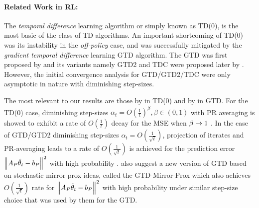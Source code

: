 \paragraph{Related Work in RL:} The \emph{temporal difference} learning algorithm or simply known as TD(0), is the most basic of the class of TD algorithms. An important shortcoming of TD(0) was its instability in the \emph{off-policy} case, and was successfully mitigated by the \emph{gradient temporal difference} learning GTD algorithm\cite{gtd2}. The GTD was first proposed by \citet{gtd} and its variants namely GTD2 and TDC were proposed later by \citet{gtd2}. However, the initial convergence analysis for GTD/GTD2/TDC were only asymptotic in nature \cite{gtd,gtd2} with diminishing step-sizes.\par
The most relevant to our results are those by \citet{korda-prashanth} in TD(0) and by \citet{gtdmp} in GTD. For the TD(0) case,  diminishing step-sizes $\alpha_t=O(\frac{1}{t})^\beta,\beta \in(0,1)$ with PR averaging is showed to exhibit a rate of $O(\frac{1}{t})$ decay for the MSE when $\beta\rightarrow 1$ \cite{korda-prashanth}. In the case of GTD/GTD2 diminishing step-sizes $\alpha_t=O(\frac{1}{\sqrt{t}})$, projection of iterates and PR-averaging leads to a rate of $O(\frac{1}{\sqrt{t}})$ is achieved for the prediction error $\left\| A_P\hat{\theta}_t-b_P\right\|^2$ with high probability \cite{gtdmp}. \citet{gtdmp} also suggest a new version of GTD based on stochastic mirror prox ideas, called the GTD-Mirror-Prox which also achieves $O(\frac{1}{\sqrt{t}})$ rate for $\left\| A_P\hat{\theta}_t-b_P\right\|^2$ with high probability under similar step-size choice that was used by them for the GTD.
